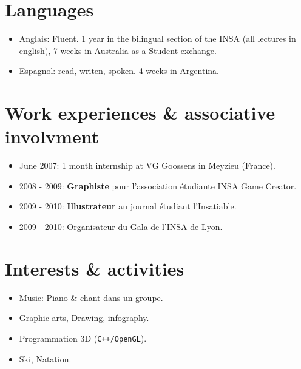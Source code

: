 \section*{Languages}
	\begin{itemize}
		\item{Anglais:} Fluent. 1 year in the bilingual section of the INSA (all lectures in english), 7 weeks in Australia as a Student exchange.
		\item{Espagnol:} read, writen, spoken. 4 weeks in Argentina.
	\end{itemize}
\section*{Work experiences & associative involvment}
	\begin{itemize}
		\item{June 2007: } 1 month internship at VG Goossens in Meyzieu (France).
		\item{2008 - 2009:} \textbf{Graphiste} pour l'association étudiante INSA Game Creator.
		\item{2009 - 2010:} \textbf{Illustrateur} au journal étudiant l'Insatiable.
		\item{2009 - 2010:} Organisateur du Gala de l'INSA de Lyon.
	\end{itemize}
\section*{Interests & activities}
	\begin{itemize}
		\item{Music:} Piano & chant dans un groupe.
		\item{Graphic arts, Drawing, infography}.
		\item{Programmation} 3D (\texttt{C++/OpenGL}).
		\item Ski, Natation.
	\end{itemize}



